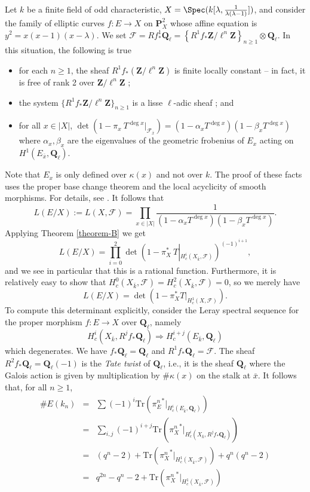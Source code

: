 \noindent
Let $k$ be a finite field of odd characteristic,
$X=\Spec(k[\lambda, \frac{1}{\lambda(\lambda-1)}])$, and
consider the family of elliptic
curves $f: E\to X$ on $\mathbf{P}^2_X$ whose affine equation is $y^2 =
x(x-1)(x-\lambda)$. We set $\mathcal{F} = Rf_*^1\mathbf{Q}_\ell =
\left\{R^1f_*\mathbf{Z}/\ell^n\mathbf{Z}\right\}_{n\geq 1} \otimes
\mathbf{Q}_\ell$. In this situation, the following is true
\begin{itemize}	
\item for each $n \geq 1$, the sheaf $R^1f_*(\mathbf{Z}/\ell^n\mathbf{Z})$ is
finite locally constant -- in fact, it is free of rank 2 over
$\mathbf{Z}/\ell^n\mathbf{Z}$ ;
\item the system $\{R^1f_*\mathbf{Z}/\ell^n\mathbf{Z}\}_{n\geq 1}$ is a lisse
$\ell$-adic sheaf ; and
\item for all $x\in |X|$, $\det\left(1-\pi_x\ T^{\deg
x}\big|_{\mathcal{F}_{\bar x}}\right) = (1-\alpha_x T^{\deg x})(1-\beta_x
T^{\deg x })$ where $\alpha_x, \beta_x$ are the eigenvalues of the geometric
frobenius of $E_x$ acting on $H^1(E_{\bar x}, \mathbf{Q}_\ell)$.
\end{itemize}
Note that $E_x$ is only defined over $\kappa(x)$ and not over $k$. The proof of
these facts uses the proper base change theorem and the local acyclicity of
smooth morphisms. For details, see \cite{SGA4.5}. It follows that
$$
L(E/X) := L(X, \mathcal{F}) = \prod_{x\in |X|}
\frac{1}{(1-\alpha_xT^{\deg x})(1-\beta_xT^{\deg x })} .
$$
Applying Theorem \ref{theorem-B} we get
$$
L(E/X) = \prod_{i=0}^2\det\left(1-\pi_X^*\ T\left|_{H_c^i(X_{\bar k},
\mathcal{F})}\right.\right)^{(-1)^{i+1}},
$$
and we see in particular that this is a rational function. Furthermore, it is
relatively easy to show that $H_c^0(X_{\bar k}, \mathcal{F}) = H_c^2(X_{\bar
k}, \mathcal{F}) = 0$, so we merely have
$$
L(E/X) = \det\left(1-\pi_X^*T\big|_{H_c^1(X, \mathcal{F})}\right).
$$
To compute this determinant explicitly, consider the Leray spectral sequence
for the proper morphism $f:E \to X$ over $\mathbf{Q}_\ell$, namely
$$
H_c^i(X_{\bar k}, R^jf_*\mathbf{Q}_\ell) \Rightarrow H_c^{i+j}(E_{\bar
k}, \mathbf{Q}_\ell)
$$
which degenerates. We have $f_*\mathbf{Q}_\ell=\mathbf{Q}_\ell$ and
$R^1f_*\mathbf{Q}_\ell = \mathcal{F}$. The sheaf $R^2f_*\mathbf{Q}_\ell =
\mathbf{Q}_\ell(-1)$ is the {\it Tate twist} of $\mathbf{Q}_\ell$, i.e.,
it is the sheaf $\mathbf{Q}_\ell$ where the Galois action is given by
multiplication by $\#\kappa(x)$ on the stalk at $\bar x$. It follows that,
for all $n\geq 1$,
\begin{eqnarray*}
\# E(k_n) & = & \sum(-1)^i\text{Tr}\left({\pi_E^n}^*\big|_{H_c^i(E_{\bar k},
\mathbf{Q}_\ell)}\right)\\
& = & \sum_{i, j}(-1)^{i+j}\text{Tr}\left({\pi^n_X}^*\big|_{H_c^i(X_{\bar k},
R^jf_*\mathbf{Q}_\ell)}\right)\\
& = & (q^n-2) + \text{Tr}\left( {\pi_X^n}^*\big|_{H_c^1(X_{\bar k},
\mathcal{F})}\right)+ q^n (q^n-2)\\
& = & q^{2n} - q^n-2 +\text{Tr}\left( {\pi_X^n}^*\big|_{H_c^1(X_{\bar k},
\mathcal{F})}\right)
\end{eqnarray*}
